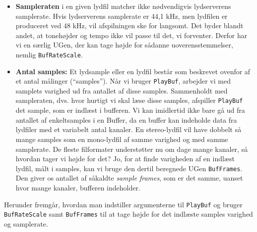 \begin{itemize}
\item \textbf{Sampleraten} i en given lydfil matcher ikke nødvendigvis lydserverens samplerate. Hvis lydserverens samplerate er 44,1 kHz, men lydfilen er produceret ved 48 kHz, vil afspilningen ske for langsomt. Det byder blandt andet, at tonehøjder og tempo ikke vil passe til det, vi forventer. Derfor har vi en særlig UGen, der kan tage højde for sådanne uoverensstemmelser, nemlig \texttt{BufRateScale}.
\item \textbf{Antal samples:} Et lydsample eller en lydfil består som beskrevet ovenfor af et antal målinger (\enquote{samples}). Når vi bruger \texttt{PlayBuf}, arbejder vi med samplets varighed ud fra antallet af disse samples. Sammenholdt med sampleraten, dvs. hvor hurtigt vi skal læse disse samples, afspiller \texttt{PlayBuf} det sample, som er indlæst i bufferen. Vi kan imidlertid ikke bare gå ud fra antallet af enkeltsamples i en Buffer, da en buffer kan indeholde data fra lydfiler med et variabelt antal kanaler. En stereo-lydfil vil have dobbelt så mange samples som en mono-lydfil af samme varighed og med samme samplerate. De fleste filformater understøtter nu om dage mange kanaler, så hvordan tager vi højde for det? Jo, for at finde varigheden af en indlæst lydfil, målt i samples, kan vi bruge den dertil beregnede UGen \texttt{BufFrames}. Den giver os antallet af såkaldte \textit{sample frames}, som er det samme, uanset hvor mange kanaler, bufferen indeholder. 
\end{itemize}

Herunder fremgår, hvordan man indstiller argumenterne til \texttt{PlayBuf} og bruger \texttt{BufRateScale} samt \texttt{BufFrames} til at tage højde for det indlæste samples varighed og samplerate.

